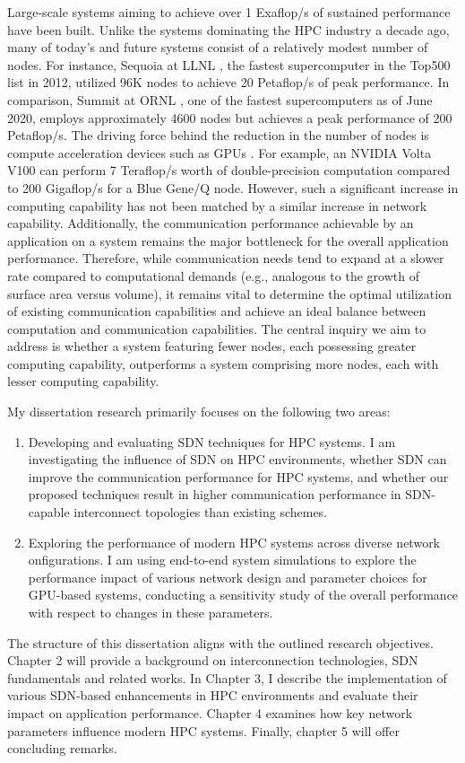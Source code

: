Large-scale systems aiming to achieve over 1 Exaflop/s of sustained performance have been built.
 Unlike the systems dominating the HPC industry
a decade ago, many of today's and future systems consist of a relatively modest
number of nodes. For instance, Sequoia at LLNL \cite{sequa}, the fastest supercomputer in
the Top500 list in 2012, utilized 96K nodes to achieve 20 Petaflop/s of peak
performance. In comparison, Summit at ORNL \cite{summit}, one of the fastest
supercomputers as of June 2020, employs approximately 4600 nodes but achieves a
peak performance of 200 Petaflop/s. The driving force behind the reduction in the
number of nodes is compute acceleration devices such as GPUs \cite{owens2008gpu}. For example,
an NVIDIA Volta V100 can perform 7 Teraflop/s worth of double-precision
computation compared to 200 Gigaflop/s for a Blue Gene/Q node. However, such a
significant increase in computing capability has not been matched by a similar
increase in network capability. Additionally, the communication performance
achievable by an application on a system remains the major bottleneck for the overall 
application performance.  Therefore, while communication needs tend to expand at a slower
rate compared to computational demands (e.g., analogous to the growth of surface
area versus volume), it remains vital to determine the optimal utilization of
existing communication capabilities and achieve an ideal balance between
computation and communication capabilities.  The central inquiry we aim to
address is whether a system featuring fewer nodes, each possessing greater
computing capability, outperforms a system comprising more nodes, each with
lesser computing capability. 


My dissertation research primarily focuses on the following two areas:

\begin{enumerate} 
\item Developing and evaluating SDN techniques for HPC systems.
I am investigating the influence of SDN on HPC
environments, whether SDN can improve the communication performance for HPC
systems, and whether our proposed techniques result in higher communication
performance in SDN-capable interconnect topologies than existing schemes.
\item Exploring the performance of modern HPC systems across diverse network onfigurations.
I am using end-to-end system simulations to explore the
performance impact of various network design and parameter choices for
GPU-based systems,
conducting a sensitivity study of the overall performance with respect to
 changes in these parameters.  
\end{enumerate} 



The structure of this dissertation aligns with the outlined research
objectives.
Chapter 2 will provide a background on interconnection technologies, 
SDN fundamentals and related works. 
In Chapter 3, I describe the implementation of various SDN-based enhancements in HPC environments and evaluate their impact on application performance. Chapter 4 examines how key network parameters influence modern HPC systems.
Finally, chapter 5 will offer
concluding remarks.

